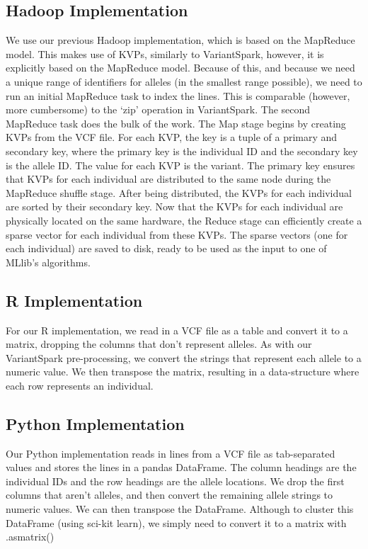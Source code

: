 \documentclass{bmcart}
\newcommand{\variantSpark}{{\sc VariantSpark}}
\begin{document}
\subsection*{Hadoop Implementation}
We use our previous Hadoop implementation, which is based on the MapReduce model. This makes use of KVPs, similarly to \variantSpark{}, however, it is explicitly based on the MapReduce model.
Because of this, and because we need a unique range of identifiers for alleles (in the smallest range possible), we need to run an initial MapReduce task to index the lines. This is comparable (however, more cumbersome) to the `zip' operation in \variantSpark{}.
The second MapReduce task does the bulk of the work. The Map stage begins by creating KVPs from the VCF file. For each KVP, the key is a tuple of a primary and secondary key, where the primary key is the individual ID and the secondary key is the allele ID. The value for each KVP is the variant.
The primary key ensures that KVPs for each individual are distributed to the same node during the MapReduce shuffle stage. After being distributed, the KVPs for each individual are sorted by their secondary key.
Now that the KVPs for each individual are physically located on the same hardware, the Reduce stage can efficiently create a sparse vector for each individual from these KVPs. The sparse vectors (one for each individual) are saved to disk, ready to be used as the input to one of MLlib's algorithms.


\subsection*{R Implementation}
For our R implementation, we read in a VCF file as a table and convert it to a matrix, dropping the columns that don't represent alleles. As with our \variantSpark{} pre-processing, we convert the strings that represent each allele to a numeric value.
We then transpose the matrix, resulting in a data-structure where each row represents an individual.


\subsection*{Python Implementation}
Our Python implementation reads in lines from a VCF file as tab-separated values and stores the lines in a pandas DataFrame. The column headings are the individual IDs and the row headings are the allele locations.
We drop the first columns that aren't alleles, and then convert the remaining allele strings to numeric values. We can then transpose the DataFrame. Although to cluster this DataFrame (using sci-kit learn), we simply need to convert it to a matrix with {\sc .as\textunderscore{}matrix()}
\end{document}
